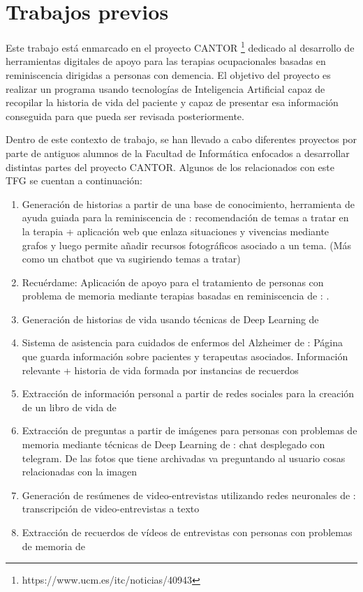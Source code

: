 \section{Trabajos previos}

Este trabajo está enmarcado en el proyecto CANTOR \footnote{https://www.ucm.es/itc/noticias/40943} dedicado al desarrollo de herramientas digitales de apoyo para las terapias ocupacionales basadas en reminiscencia dirigidas a personas con demencia. El objetivo del proyecto es realizar un programa usando tecnologías de Inteligencia Artificial capaz de recopilar la historia de vida del paciente y capaz de presentar esa información conseguida para que pueda ser revisada posteriormente. 

Dentro de este contexto de trabajo, se han llevado a cabo diferentes proyectos por parte de antiguos alumnos de la Facultad de Informática enfocados a desarrollar distintas partes del proyecto CANTOR. Algunos de los relacionados con este TFG se cuentan a continuación: 

\begin{enumerate}
	\item Generación de historias a partir de una base de conocimiento, herramienta de ayuda guiada para la reminiscencia de \cite{lcastilla}: recomendación de temas a tratar en la terapia + aplicación web que enlaza situaciones y vivencias mediante grafos y luego permite añadir recursos fotográficos asociado a un tema. (Más como un chatbot que va sugiriendo temas a tratar)
	\item Recuérdame: Aplicación de apoyo para el tratamiento de personas con problema de memoria mediante terapias basadas en reminiscencia de \cite{cbarquilla}:  .
	\item Generación de historias de vida usando técnicas de Deep Learning de \cite{calameda}
	\item Sistema de asistencia para cuidados de enfermos del Alzheimer de \cite{dbedinger} : Página que guarda información sobre pacientes y terapeutas asociados. Información relevante + historia de vida formada por instancias de recuerdos
	\item Extracción de información personal a partir de redes sociales para la creación de un libro de vida de \cite{paguilera}
	\item Extracción de preguntas a partir de imágenes para personas con problemas de memoria mediante técnicas de Deep Learning de \cite{aaizel} : chat desplegado con telegram. De las fotos que tiene archivadas va preguntando al usuario cosas relacionadas con la imagen
	\item Generación de resúmenes de video-entrevistas utilizando redes neuronales de \cite{dalcazar} : transcripción de video-entrevistas a texto
	\item Extracción de recuerdos de vídeos de entrevistas con personas con problemas de memoria de \cite{hgarcia}
\end{enumerate}

